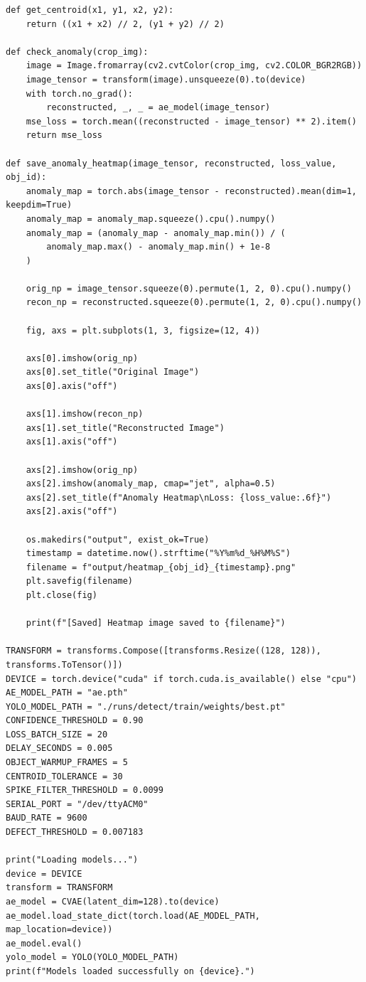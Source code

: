 \begin{verbatim}
def get_centroid(x1, y1, x2, y2):
    return ((x1 + x2) // 2, (y1 + y2) // 2)

def check_anomaly(crop_img):
    image = Image.fromarray(cv2.cvtColor(crop_img, cv2.COLOR_BGR2RGB))
    image_tensor = transform(image).unsqueeze(0).to(device)
    with torch.no_grad():
        reconstructed, _, _ = ae_model(image_tensor)
    mse_loss = torch.mean((reconstructed - image_tensor) ** 2).item()
    return mse_loss

def save_anomaly_heatmap(image_tensor, reconstructed, loss_value, obj_id):
    anomaly_map = torch.abs(image_tensor - reconstructed).mean(dim=1, keepdim=True)
    anomaly_map = anomaly_map.squeeze().cpu().numpy()
    anomaly_map = (anomaly_map - anomaly_map.min()) / (
        anomaly_map.max() - anomaly_map.min() + 1e-8
    )

    orig_np = image_tensor.squeeze(0).permute(1, 2, 0).cpu().numpy()
    recon_np = reconstructed.squeeze(0).permute(1, 2, 0).cpu().numpy()

    fig, axs = plt.subplots(1, 3, figsize=(12, 4))

    axs[0].imshow(orig_np)
    axs[0].set_title("Original Image")
    axs[0].axis("off")

    axs[1].imshow(recon_np)
    axs[1].set_title("Reconstructed Image")
    axs[1].axis("off")

    axs[2].imshow(orig_np)
    axs[2].imshow(anomaly_map, cmap="jet", alpha=0.5)
    axs[2].set_title(f"Anomaly Heatmap\nLoss: {loss_value:.6f}")
    axs[2].axis("off")

    os.makedirs("output", exist_ok=True)
    timestamp = datetime.now().strftime("%Y%m%d_%H%M%S")
    filename = f"output/heatmap_{obj_id}_{timestamp}.png"
    plt.savefig(filename)
    plt.close(fig)

    print(f"[Saved] Heatmap image saved to {filename}")

TRANSFORM = transforms.Compose([transforms.Resize((128, 128)), transforms.ToTensor()])
DEVICE = torch.device("cuda" if torch.cuda.is_available() else "cpu")
AE_MODEL_PATH = "ae.pth"
YOLO_MODEL_PATH = "./runs/detect/train/weights/best.pt"
CONFIDENCE_THRESHOLD = 0.90
LOSS_BATCH_SIZE = 20
DELAY_SECONDS = 0.005
OBJECT_WARMUP_FRAMES = 5
CENTROID_TOLERANCE = 30
SPIKE_FILTER_THRESHOLD = 0.0099
SERIAL_PORT = "/dev/ttyACM0"
BAUD_RATE = 9600
DEFECT_THRESHOLD = 0.007183

print("Loading models...")
device = DEVICE
transform = TRANSFORM
ae_model = CVAE(latent_dim=128).to(device)
ae_model.load_state_dict(torch.load(AE_MODEL_PATH, map_location=device))
ae_model.eval()
yolo_model = YOLO(YOLO_MODEL_PATH)
print(f"Models loaded successfully on {device}.")


\end{verbatim}
